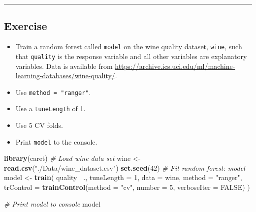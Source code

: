 \documentclass[
]{book}
\newenvironment{Shaded}{\begin{snugshade}}{\end{snugshade}}
\newcommand{\CommentTok}[1]{\textcolor[rgb]{0.56,0.35,0.01}{\textit{#1}}}
\newcommand{\DataTypeTok}[1]{\textcolor[rgb]{0.13,0.29,0.53}{#1}}
\newcommand{\DecValTok}[1]{\textcolor[rgb]{0.00,0.00,0.81}{#1}}
\newcommand{\KeywordTok}[1]{\textcolor[rgb]{0.13,0.29,0.53}{\textbf{#1}}}
\newcommand{\NormalTok}[1]{#1}
\newcommand{\OperatorTok}[1]{\textcolor[rgb]{0.81,0.36,0.00}{\textbf{#1}}}
\newcommand{\OtherTok}[1]{\textcolor[rgb]{0.56,0.35,0.01}{#1}}
\newcommand{\StringTok}[1]{\textcolor[rgb]{0.31,0.60,0.02}{#1}}
\begin{document}
\begin{center}\rule{0.5\linewidth}{0.5pt}\end{center}

\hypertarget{exercise-17}{%
\subsection*{Exercise}\label{exercise-17}}

\begin{itemize}
\item
  Train a random forest called \texttt{model} on the wine quality dataset, \texttt{wine}, such that \texttt{quality} is the response variable and all other variables are explanatory variables. Data is available from \url{https://archive.ics.uci.edu/ml/machine-learning-databases/wine-quality/}.
\item
  Use \texttt{method\ =\ "ranger"}.
\item
  Use a \texttt{tuneLength} of 1.
\item
  Use 5 CV folds.
\item
  Print \texttt{model} to the console.
\end{itemize}

\begin{Shaded}
\begin{Highlighting}[]
\KeywordTok{library}\NormalTok{(caret)}
\CommentTok{# Load wine data set}
\NormalTok{wine <-}\StringTok{ }\KeywordTok{read.csv}\NormalTok{(}\StringTok{"./Data/wine_dataset.csv"}\NormalTok{)}
\KeywordTok{set.seed}\NormalTok{(}\DecValTok{42}\NormalTok{)}
\CommentTok{# Fit random forest: model}
\NormalTok{model <-}\StringTok{ }\KeywordTok{train}\NormalTok{(}
\NormalTok{  quality }\OperatorTok{~}\NormalTok{.,}
  \DataTypeTok{tuneLength =} \DecValTok{1}\NormalTok{,}
  \DataTypeTok{data =}\NormalTok{ wine, }
  \DataTypeTok{method =} \StringTok{"ranger"}\NormalTok{,}
  \DataTypeTok{trControl =} \KeywordTok{trainControl}\NormalTok{(}\DataTypeTok{method =} \StringTok{"cv"}\NormalTok{, }
                           \DataTypeTok{number =} \DecValTok{5}\NormalTok{, }
                           \DataTypeTok{verboseIter =} \OtherTok{FALSE}\NormalTok{)}
\NormalTok{)}

\CommentTok{# Print model to console}
\NormalTok{model}
\end{Highlighting}
\end{Shaded}
\end{document}
